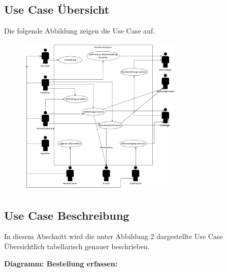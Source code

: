 \subsection{Use Case Übersicht}
Die folgende Abbildung zeigen die Use Case auf.

\begin{figure}[H]%
\centering
\includegraphics[width=0.7\textwidth]{Images/usecase-u.png}
\label{fig:usecase}
\end{figure}


\subsection{Use Case Beschreibung}
In diesem Abschnitt wird die unter Abbildung 2 dargestellte Use Case Übersichtlich tabellarisch genauer beschrieben.






\newpage
\textbf{Diagramm: Bestellung erfassen:}

